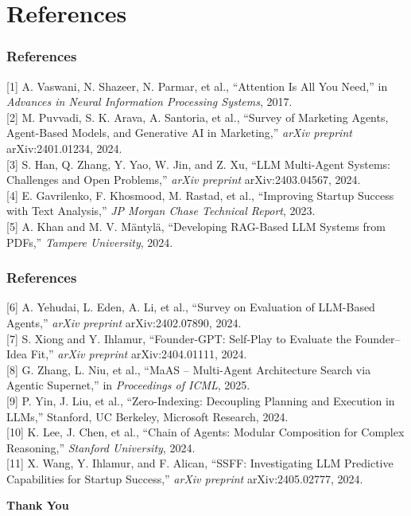 \documentclass{beamer}
\begin{document}
\section{References}

\begin{frame}
\frametitle{References}
\footnotesize{

[1] A. Vaswani, N. Shazeer, N. Parmar, et al., “Attention Is All You Need,” in \textit{Advances in Neural Information Processing Systems}, 2017. \\

[2] M. Puvvadi, S. K. Arava, A. Santoria, et al., “Survey of Marketing Agents, Agent-Based Models, and Generative AI in Marketing,” \textit{arXiv preprint} arXiv:2401.01234, 2024. \\

[3] S. Han, Q. Zhang, Y. Yao, W. Jin, and Z. Xu, “LLM Multi-Agent Systems: Challenges and Open Problems,” \textit{arXiv preprint} arXiv:2403.04567, 2024. \\

[4] E. Gavrilenko, F. Khosmood, M. Rastad, et al., “Improving Startup Success with Text Analysis,” \textit{JP Morgan Chase Technical Report}, 2023. \\

[5] A. Khan and M. V. Mäntylä, “Developing RAG-Based LLM Systems from PDFs,” \textit{Tampere University}, 2024. \\
}
\end{frame}

\begin{frame}
\frametitle{References}
\footnotesize{
[6] A. Yehudai, L. Eden, A. Li, et al., “Survey on Evaluation of LLM-Based Agents,” \textit{arXiv preprint} arXiv:2402.07890, 2024. \\

[7] S. Xiong and Y. Ihlamur, “Founder-GPT: Self-Play to Evaluate the Founder–Idea Fit,” \textit{arXiv preprint} arXiv:2404.01111, 2024. \\

[8] G. Zhang, L. Niu, et al., “MaAS – Multi-Agent Architecture Search via Agentic Supernet,” in \textit{Proceedings of ICML}, 2025. \\

[9] P. Yin, J. Liu, et al., “Zero-Indexing: Decoupling Planning and Execution in LLMs,” Stanford, UC Berkeley, Microsoft Research, 2024. \\

[10] K. Lee, J. Chen, et al., “Chain of Agents: Modular Composition for Complex Reasoning,” \textit{Stanford University}, 2024. \\

[11] X. Wang, Y. Ihlamur, and F. Alican, “SSFF: Investigating LLM Predictive Capabilities for Startup Success,” \textit{arXiv preprint} arXiv:2405.02777, 2024. \\

}
\end{frame}



\begin{frame}
\centering
\Huge \textbf{Thank You}
\end{frame}
\end{document}
